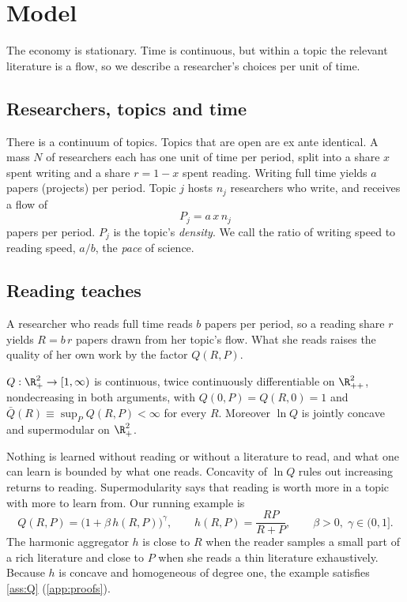 \section{Model}\label{sec:model}

The economy is stationary. Time is continuous, but within a topic the relevant
literature is a flow, so we describe a researcher's choices per unit of time.

\subsection{Researchers, topics and time}

There is a continuum of topics. Topics that are open are ex ante identical. A
mass $N$ of researchers each has one unit of time per period, split into a
share $x$ spent writing and a share $r=1-x$ spent reading. Writing full time
yields $a$ papers (projects) per period. Topic $j$ hosts $n_j$ researchers who
write, and receives a flow of
\begin{equation}\label{eq:flow}
P_j = a\,x\,n_j
\end{equation}
papers per period. $P_j$ is the topic's \emph{density}. We call the ratio of
writing speed to reading speed, $a/b$, the \emph{pace} of science.

\subsection{Reading teaches}

A researcher who reads full time reads $b$ papers per period, so a reading
share $r$ yields $R=b\,r$ papers drawn from her topic's flow. What she reads
raises the quality of her own work by the factor $Q(R,P)$.

\begin{assumption}[Learning]\label{ass:Q}
$Q:\R_+^2\to[1,\infty)$ is continuous, twice continuously differentiable on
$\R_{++}^2$, nondecreasing in both arguments, with $Q(0,P)=Q(R,0)=1$ and
$\bar Q(R)\equiv\sup_P Q(R,P)<\infty$ for every $R$. Moreover $\ln Q$ is
jointly concave and supermodular on $\R_+^2$.
\end{assumption}

Nothing is learned without reading or without a literature to read, and what
one can learn is bounded by what one reads. Concavity of $\ln Q$ rules out
increasing returns to reading. Supermodularity says that reading is worth
more in a topic with more to learn from. Our running example is
\begin{equation}\label{eq:Qexample}
Q(R,P) = \big(1+\beta\,h(R,P)\big)^{\gamma},\qquad h(R,P)=\frac{RP}{R+P},\qquad \beta>0,\;\gamma\in(0,1].
\end{equation}
The harmonic aggregator $h$ is close to $R$ when the reader samples a small
part of a rich literature and close to $P$ when she reads a thin literature
exhaustively. Because $h$ is concave and homogeneous of degree one, the
example satisfies \cref{ass:Q} (\cref{app:proofs}).

